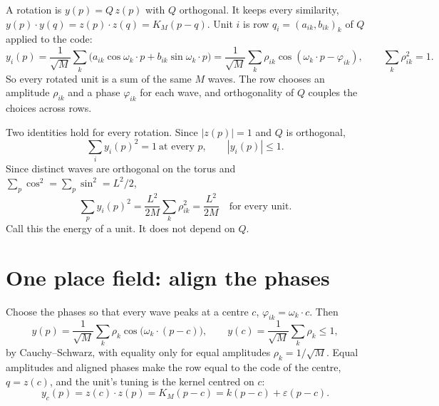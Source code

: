 \documentclass[11pt]{article}
\begin{document}
A rotation is $y(p) = Q\,z(p)$ with $Q$ orthogonal. It keeps every similarity,
$y(p)\cdot y(q) = z(p)\cdot z(q) = K_M(p - q)$. Unit $i$ is row $q_i = (a_{ik}, b_{ik})_k$ of $Q$
applied to the code:
\begin{equation}
  y_i(p) = \frac{1}{\sqrt M}\sum_k \bigl(a_{ik}\cos\omega_k\!\cdot p + b_{ik}\sin\omega_k\!\cdot p\bigr)
         = \frac{1}{\sqrt M}\sum_k \rho_{ik}\cos(\omega_k\!\cdot p - \varphi_{ik}),
  \qquad \sum_k \rho_{ik}^2 = 1 .
  \label{eq:unit}
\end{equation}
So every rotated unit is a sum of the same $M$ waves. The row chooses an amplitude $\rho_{ik}$ and a
phase $\varphi_{ik}$ for each wave, and orthogonality of $Q$ couples the choices across rows.

Two identities hold for every rotation. Since $|z(p)| = 1$ and $Q$ is orthogonal,
\begin{equation}
  \sum_i y_i(p)^2 = 1 \ \text{at every } p, \qquad |y_i(p)| \le 1 .
  \label{eq:norm}
\end{equation}
Since distinct waves are orthogonal on the torus and $\sum_p \cos^2 = \sum_p \sin^2 = L^2/2$,
\begin{equation}
  \sum_p y_i(p)^2 = \frac{L^2}{2M}\sum_k\rho_{ik}^2 = \frac{L^2}{2M}\quad\text{for every unit.}
  \label{eq:energy}
\end{equation}
Call this the energy of a unit. It does not depend on $Q$.

\section{One place field: align the phases}

Choose the phases so that every wave peaks at a centre $c$, $\varphi_{ik} = \omega_k\cdot c$. Then
\begin{equation}
  y(p) = \frac{1}{\sqrt M}\sum_k \rho_k\cos\bigl(\omega_k\!\cdot(p - c)\bigr),\qquad
  y(c) = \frac{1}{\sqrt M}\sum_k\rho_k \le 1,
\end{equation}
by Cauchy--Schwarz, with equality only for equal amplitudes $\rho_k = 1/\sqrt M$. Equal amplitudes
and aligned phases make the row equal to the code of the centre, $q = z(c)$, and the unit's tuning
is the kernel centred on $c$:
\begin{equation}
  y_c(p) = z(c)\cdot z(p) = K_M(p - c) = k(p - c) + \varepsilon(p - c).
  \label{eq:matched}
\end{equation}
\end{document}
